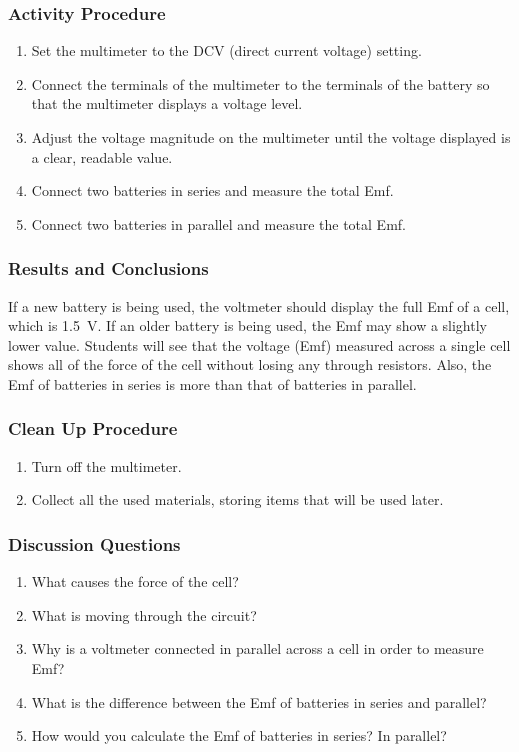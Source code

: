 \subsubsection*{Activity Procedure}
\begin{enumerate}
\item{Set the multimeter to the DCV (direct current voltage) setting.} 
\item{Connect the terminals of the multimeter to the terminals of the battery so that the multimeter displays a voltage level.} 
\item{Adjust the voltage magnitude on the multimeter until the voltage displayed is a clear, readable value.} 
\item{Connect two batteries in series and measure the total Emf.}
\item{Connect two batteries in parallel and measure the total Emf.}
\end{enumerate}

\subsubsection*{Results and Conclusions}
If a new battery is being used, the voltmeter should display the full Emf of a cell, which is 1.5~V. If an older battery is being used, the Emf may show a slightly lower value. Students will see that the voltage (Emf) measured across a single cell shows all of the force of the cell without losing any through resistors. Also, the Emf of batteries in series is more than that of batteries in parallel.

\subsubsection*{Clean Up Procedure}
\begin{enumerate}
\item{Turn off the multimeter.} 
\item{Collect all the used materials, storing items that will be used later.} 
\end{enumerate}

\subsubsection*{Discussion Questions}
\begin{enumerate}
\item{What causes the force of the cell?}
\item{What is moving through the circuit?}
\item{Why is a voltmeter connected in parallel across a cell in order to measure Emf?}
\item{What is the difference between the Emf of batteries in series and parallel?}
\item{How would you calculate the Emf of batteries in series? In parallel?}
\end{enumerate}

